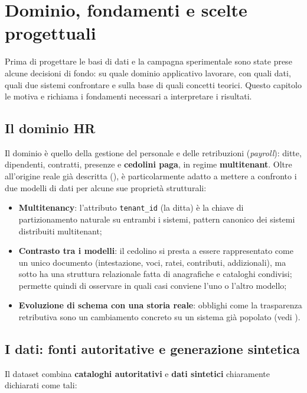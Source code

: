 \chapter{Dominio, fondamenti e scelte progettuali}
\label{ch:dominio}

Prima di progettare le basi di dati e la campagna sperimentale sono state prese alcune decisioni di fondo: su
quale dominio applicativo lavorare, con quali dati, quali due sistemi confrontare e sulla base di quali
concetti teorici. Questo capitolo le motiva e richiama i fondamenti necessari a interpretare i risultati.

\section{Il dominio HR}
\label{sec:dominio}

Il dominio è quello della gestione del personale e delle retribuzioni (\emph{payroll}): ditte, dipendenti,
contratti, presenze e \textbf{cedolini paga}, in regime \textbf{multitenant}. Oltre all'origine reale già
descritta (), è particolarmente adatto a mettere a confronto i due modelli di dati per
alcune sue proprietà strutturali:

\begin{itemize}
  \item \textbf{Multitenancy}: l'attributo \texttt{tenant\_id} (la ditta) è la chiave di partizionamento
        naturale su entrambi i sistemi, pattern canonico dei sistemi distribuiti multitenant;
  \item \textbf{Contrasto tra i modelli}: il cedolino si presta a essere rappresentato come un unico documento
        (intestazione, voci, ratei, contributi, addizionali), ma sotto ha una struttura relazionale fatta di
        anagrafiche e cataloghi condivisi; permette quindi di osservare in quali casi conviene l'uno o l'altro
        modello;
  \item \textbf{Evoluzione di schema con una storia reale}: obblighi come la trasparenza retributiva sono un
        cambiamento concreto su un sistema già popolato (vedi ).
\end{itemize}

\section{I dati: fonti autoritative e generazione sintetica}
\label{sec:dati}

Il dataset combina \textbf{cataloghi autoritativi} e \textbf{dati sintetici} chiaramente dichiarati come tali:

